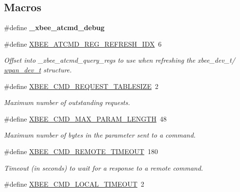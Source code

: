 \subsection*{Macros}
\begin{DoxyCompactItemize}
\item 
\hypertarget{group__xbee__atcmd_gaa0a5c0b4df3e37c4a829f4675818fbbf}{\#define {\bfseries \-\_\-xbee\-\_\-atcmd\-\_\-debug}}\label{group__xbee__atcmd_gaa0a5c0b4df3e37c4a829f4675818fbbf}

\item 
\#define \hyperlink{group__xbee__atcmd_ga23209b601f70aa30a5a6997c9baf313e}{X\-B\-E\-E\-\_\-\-A\-T\-C\-M\-D\-\_\-\-R\-E\-G\-\_\-\-R\-E\-F\-R\-E\-S\-H\-\_\-\-I\-D\-X}~6
\begin{DoxyCompactList}\small\item\em Offset into \-\_\-xbee\-\_\-atcmd\-\_\-query\-\_\-regs to use when refreshing the xbee\-\_\-dev\-\_\-t/ \hyperlink{structwpan__dev__t}{wpan\-\_\-dev\-\_\-t} structure. \end{DoxyCompactList}\item 
\#define \hyperlink{group__xbee__atcmd_gaf992e9b985e2b1eb185ef3d2d38a01c0}{X\-B\-E\-E\-\_\-\-C\-M\-D\-\_\-\-R\-E\-Q\-U\-E\-S\-T\-\_\-\-T\-A\-B\-L\-E\-S\-I\-Z\-E}~2
\begin{DoxyCompactList}\small\item\em Maximum number of outstanding requests. \end{DoxyCompactList}\item 
\#define \hyperlink{group__xbee__atcmd_ga9b1046f9c200c1bb0a9b57cb0ec474df}{X\-B\-E\-E\-\_\-\-C\-M\-D\-\_\-\-M\-A\-X\-\_\-\-P\-A\-R\-A\-M\-\_\-\-L\-E\-N\-G\-T\-H}~48
\begin{DoxyCompactList}\small\item\em Maximum number of bytes in the parameter sent to a command. \end{DoxyCompactList}\item 
\#define \hyperlink{group__xbee__atcmd_ga386fdd4cf7046c98379878dab89e5012}{X\-B\-E\-E\-\_\-\-C\-M\-D\-\_\-\-R\-E\-M\-O\-T\-E\-\_\-\-T\-I\-M\-E\-O\-U\-T}~180
\begin{DoxyCompactList}\small\item\em Timeout (in seconds) to wait for a response to a remote command. \end{DoxyCompactList}\item 
\hypertarget{group__xbee__atcmd_gae5e93a4c6f52f5853d19a8b4a78810a6}{\#define \hyperlink{group__xbee__atcmd_gae5e93a4c6f52f5853d19a8b4a78810a6}{X\-B\-E\-E\-\_\-\-C\-M\-D\-\_\-\-L\-O\-C\-A\-L\-\_\-\-T\-I\-M\-E\-O\-U\-T}~2}\label{group__xbee__atcmd_gae5e93a4c6f52f5853d19a8b4a78810a6}


\end{DoxyCompactItemize}
